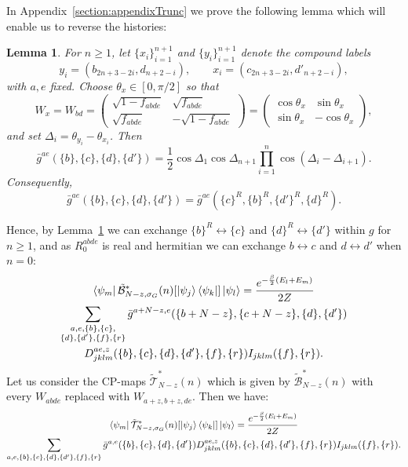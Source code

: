 \documentclass[aps,floatfix,10pt,amssymb,amsfont,amsmath,superscriptaddress,float,nofootinbib,longbibliography,nobalancelastpage,twocolumn]{revtex4-2}
\newtheorem{lemma}{Lemma}
\begin{document}
In Appendix~\ref{section:appendixTrunc} we prove the following lemma which will enable us to reverse the histories:
\begin{lemma}
\label{lemma:summed-history-reversal}
For $n\geq1$, let $\{x_i\}_{i=1}^{n+1}$ and $\{y_i\}_{i=1}^{n+1}$ denote
the compound labels
\begin{equation*}
    y_i=(b_{2n+3-2i},d_{n+2-i}),\qquad x_i=(c_{2n+3-2i},d'_{n+2-i}),
\end{equation*}
with $a,e$ fixed.  Choose $\theta_x\in[0,\pi/2]$ so that
\begin{equation*}
    W_x=W_{bd}=\begin{pmatrix}
                \sqrt{1 - f_{abde}} & \sqrt{f_{abde}}\\
       \sqrt{f_{abde}} & -\sqrt{1 - f_{abde}}
    \end{pmatrix}= \begin{pmatrix}\cos\theta_x&\sin\theta_x\\
    \sin\theta_x&-\cos\theta_x\end{pmatrix},
\end{equation*}
and set $\Delta_i=\theta_{y_i}-\theta_{x_i}$.  Then
\begin{equation}
    \bar g^{ae}(\{b\},\{c\},\{d\},\{d'\})
    =\frac12\cos\Delta_1\cos\Delta_{n+1}
      \prod_{i=1}^{n}\cos(\Delta_i-\Delta_{i+1}).
\end{equation}
Consequently,
\begin{equation}
    \bar g^{ae}(\{b\},\{c\},\{d\},\{d'\})
    =\bar g^{ae}(\{c\}^R,\{b\}^R,\{d'\}^R,\{d\}^R).
    \label{eq:PRR}
\end{equation}
\end{lemma}
Hence, by Lemma~\ref{lemma:summed-history-reversal} we can exchange $\{b\}^R \leftrightarrow \{c\}$ and $\{d\}^R \leftrightarrow \{d'\}$ within $g$ for $n\geq 1$, and as $R_0^{abde}$ is real and hermitian we can exchange $b \leftrightarrow c$ and $d \leftrightarrow d'$ when $n=0$:
\begin{multline}
         \bra{\psi_m}\tilde{\mathcal{B}}^*_{N-z,\sigma_G}(n)[\ket{\psi_j}\bra{\psi_k}]\ket{\psi_l} = \frac{e^{-\frac{\beta}{2}(E_l+E_m)}}{2Z}\\\sum_{\substack{a,e,\{b\},\{c\},\\\{d\},\{d'\},\{f\},\{r\}}} \bar g^{a+N -z,e}(\{b+N -z\},\{c+N -z\},\{d\},\{d'\}) 
         \\D^{ae,z}_{jklm}(\{b\},\{c\},\{d\},\{d'\},\{f\},\{r\})I_{jklm}(\{f\},\{r\}).  
    \label{eq:relabelline-first}
\end{multline}
Let us consider the CP-maps $\tilde{\mathcal{T}}^*_{N-z}(n)$ which is given by $\tilde{\mathcal{B}}^*_{N-z}(n)$ with every $W_{abde}$ replaced with $W_{a+z,b+z,de}$. Then we have:
\begin{multline}
         \bra{\psi_m}\tilde{\mathcal{T}}^*_{N -z,\sigma_G}(n)[\ket{\psi_j}\bra{\psi_k}]\ket{\psi_l} = \frac{e^{-\frac{\beta}{2}(E_l+E_m)}}{2Z}\\\sum_{a,e,\{b\},\{c\},\{d\},\{d'\},\{f\},\{r\}} \bar g^{a,e}(\{b\},\{c\},\{d\},\{d'\}) D^{ae,z}_{jklm}(\{b\},\{c\},\{d\},\{d'\},\{f\},\{r\})I_{jklm}(\{f\},\{r\}).
     \label{eq:relabelline-symmetrized}
\end{multline}
\end{document}

